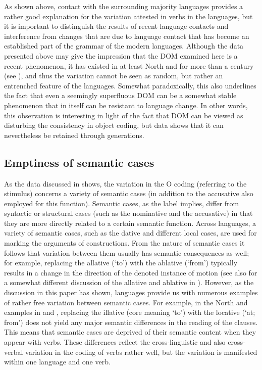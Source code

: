 \documentclass[output=paper]{LSP/langsci}
\begin{document}
 As shown above, contact with the surrounding majority languages provides a rather good explanation for the variation attested in  verbs in the  languages, but it is important to distinguish the results of recent language contacts and interference from changes that are due to language contact that has become an established part of the grammar of the modern languages. Although the data presented above may give the impression that the DOM examined here is a recent phenomenon, it has existed in at least North and   for more than a century (see ), and thus the variation cannot be seen as random, but rather an entrenched feature of the languages. Somewhat paradoxically, this also underlines the fact that even a seemingly superfluous DOM can be a somewhat stable phenomenon that in itself can be resistant to language change. In other words, this observation is interesting in light of the fact that DOM can be viewed as disturbing the consistency in object coding, but  data shows that it can nevertheless be retained through generations.

\subsection{Emptiness of semantic cases}
\label{16-ki-sec:4-3}

As the data discussed in  shows, the variation in the O coding (referring to the stimulus) concerns a variety of semantic cases (in addition to the accusative also employed for this function). Semantic cases, as the label implies, differ from syntactic or structural cases (such as the nominative and the accusative) in that they are more directly related to a certain semantic function. Across languages, a variety of semantic cases, such as the dative and different local cases, are used for marking the arguments of  constructions. From the nature of semantic cases it follows that variation between them usually has semantic consequences as well; for example, replacing the allative (‘to’) with the ablative (‘from’) typically results in a change in the direction of the denoted instance of motion (see also \citealt{Vasti2012Verbittomat} for a somewhat different discussion of the allative and ablative in ). However, as the discussion in this paper has shown,  languages provide us with numerous examples of rather free variation between semantic cases. For example, in the North  and   examples in  and , replacing the illative (core meaning ‘to’) with the locative (‘at; from’) does not yield any major semantic differences in the reading of the clauses. This means that semantic cases are deprived of their semantic content when they appear with  verbs. These differences reflect the cross-linguistic and also cross-verbal variation in the coding of  verbs rather well, but the variation is manifested within one language and one verb.
\end{document}
